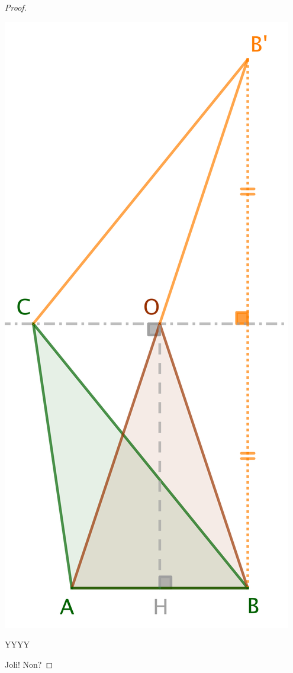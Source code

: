 \begin{proof}
	\begin{center}
		\includegraphics[scale=.4]{content/triangle/triangle-proof.png}
	\end{center}
	
	YYYY
	
	
	Joli! Non?
\end{proof}
